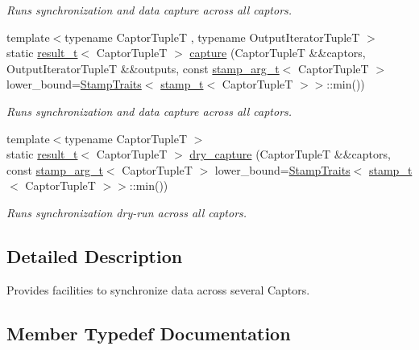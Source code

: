 \begin{DoxyCompactItemize}
\begin{DoxyCompactList}\small\item\em Runs synchronization and data capture across all captors. \end{DoxyCompactList}\item 
{\footnotesize template$<$typename Captor\+TupleT , typename Output\+Iterator\+TupleT $>$ }\\static \hyperlink{classflow_1_1_synchronizer_a4f9693650274ae93f5b9a11cb41a2d80}{result\+\_\+t}$<$ Captor\+TupleT $>$ \hyperlink{classflow_1_1_synchronizer_a802f1ac95c23442da70b0ed45669c1d5}{capture} (Captor\+TupleT \&\&captors, Output\+Iterator\+TupleT \&\&outputs, const \hyperlink{classflow_1_1_synchronizer_a0f1e7062475c9492191e29b26d09106c}{stamp\+\_\+arg\+\_\+t}$<$ Captor\+TupleT $>$ lower\+\_\+bound=\hyperlink{structflow_1_1_stamp_traits}{Stamp\+Traits}$<$ \hyperlink{classflow_1_1_synchronizer_a2a443abb40ad2413e6d5f7a7f3cfe4a7}{stamp\+\_\+t}$<$ Captor\+TupleT $>$$>$\+::min())
\begin{DoxyCompactList}\small\item\em Runs synchronization and data capture across all captors. \end{DoxyCompactList}\item 
{\footnotesize template$<$typename Captor\+TupleT $>$ }\\static \hyperlink{classflow_1_1_synchronizer_a4f9693650274ae93f5b9a11cb41a2d80}{result\+\_\+t}$<$ Captor\+TupleT $>$ \hyperlink{classflow_1_1_synchronizer_a2778cc70ecd419dd7a6171f71bf37b20}{dry\+\_\+capture} (Captor\+TupleT \&\&captors, const \hyperlink{classflow_1_1_synchronizer_a0f1e7062475c9492191e29b26d09106c}{stamp\+\_\+arg\+\_\+t}$<$ Captor\+TupleT $>$ lower\+\_\+bound=\hyperlink{structflow_1_1_stamp_traits}{Stamp\+Traits}$<$ \hyperlink{classflow_1_1_synchronizer_a2a443abb40ad2413e6d5f7a7f3cfe4a7}{stamp\+\_\+t}$<$ Captor\+TupleT $>$$>$\+::min())
\begin{DoxyCompactList}\small\item\em Runs synchronization dry-\/run across all captors. \end{DoxyCompactList}\end{DoxyCompactItemize}


\subsection{Detailed Description}
Provides facilities to synchronize data across several Captors. 

\subsection{Member Typedef Documentation}
\mbox{\label{classflow_1_1_synchronizer_a4f9693650274ae93f5b9a11cb41a2d80}} 
